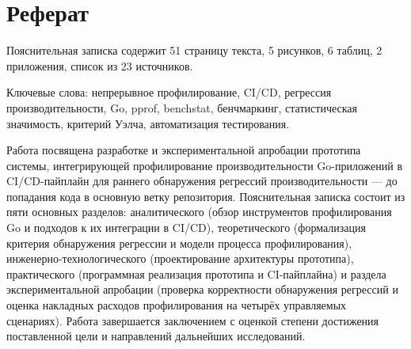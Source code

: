 \section*{Реферат}

Пояснительная записка содержит 51 страницу текста, 5
рисунков, 6 таблиц, 2 приложения, список из 23 источников.

Ключевые слова: непрерывное профилирование, CI/CD, регрессия
производительности, Go, pprof, benchstat, бенчмаркинг, статистическая
значимость, критерий Уэлча, автоматизация тестирования.

Работа посвящена разработке и экспериментальной апробации прототипа
системы, интегрирующей профилирование производительности Go-приложений в
CI/CD-пайплайн для раннего обнаружения регрессий производительности —
до попадания кода в основную ветку репозитория. Пояснительная записка
состоит из пяти основных разделов: аналитического (обзор инструментов
профилирования Go и подходов к их интеграции в CI/CD), теоретического
(формализация критерия обнаружения регрессии и модели процесса
профилирования), инженерно-технологического (проектирование архитектуры
прототипа), практического (программная реализация прототипа и CI-пайплайна)
и раздела экспериментальной апробации (проверка корректности обнаружения
регрессий и оценка накладных расходов профилирования на четырёх
управляемых сценариях). Работа завершается заключением с оценкой степени
достижения поставленной цели и направлений дальнейших исследований.
